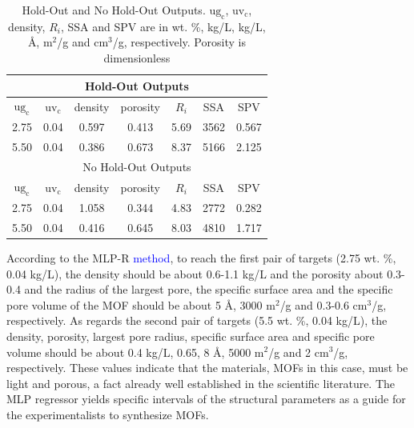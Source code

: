 \documentclass[review]{elsarticle}
\newcommand{\ugc}{\mathrm{ug_c}}
\newcommand{\uvc}{\mathrm{uv_c}}
\begin{document}
\begin{table}[H]
    \centering
    \begin{tabular}{ccccccc}
    \hline
\multicolumn{7}{c}{Hold-Out Outputs}\\
\hline
         $\ugc$   & $\uvc$   & density  & porosity & $R_i$ & SSA  & SPV\\
         2.75     & 0.04     & 0.597    & 0.413    & 5.69  & 3562 & 0.567\\
         5.50     & 0.04     & 0.386    & 0.673    & 8.37  & 5166 & 2.125\\
    \hline
\multicolumn{7}{c}{No Hold-Out Outputs}\\
\hline
         $\ugc$   & $\uvc$   & density  & porosity & $R_i$ & SSA  & SPV\\
         2.75     & 0.04     & 1.058    & 0.344    & 4.83  & 2772 & 0.282\\
         5.50     & 0.04     & 0.416    & 0.645    & 8.03  & 4810 & 1.717\\
    \hline
    \end{tabular}
    \caption{Hold-Out and No Hold-Out Outputs. 
    $\ugc$, $\uvc$, density, $R_i$, 
    SSA and SPV are in wt. \%, kg/L, kg/L, \AA{}, m$^2$/g and cm$^3$/g, 
    respectively. Porosity is dimensionless
    }
    \label{outputs}
\end{table}

According to the MLP-R \textcolor{blue}{method}, to reach the first pair of 
targets (2.75 wt. \%, 0.04 kg/L), the density should be about 0.6-1.1 kg/L and 
the porosity about 0.3-0.4 and the radius of the largest pore, the specific 
surface area and the specific pore volume of the MOF should be about 5 \AA{}, 
3000 m$^2$/g and 0.3-0.6 cm$^3$/g, respectively. As regards the second pair of 
targets (5.5 wt. \%, 0.04 kg/L), the density, porosity, largest pore radius, 
specific surface area and specific pore volume should be about 0.4 kg/L, 0.65, 
8 \AA{}, 5000 m$^2$/g and 2 cm$^3$/g, respectively. These values indicate that 
the materials, MOFs in this case, must be light and porous, a fact already well 
established in the scientific literature. The MLP regressor yields specific 
intervals of the structural parameters as a guide for the experimentalists to 
synthesize MOFs. 
\end{document}
